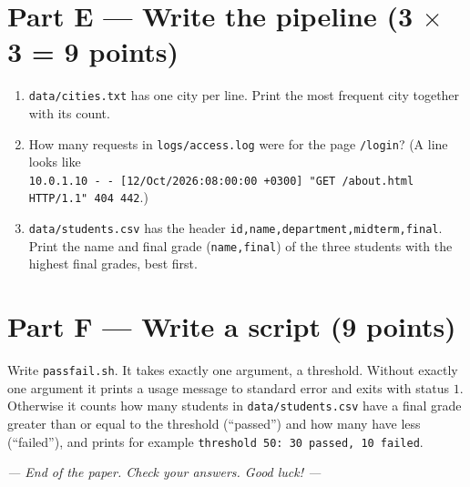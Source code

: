 \documentclass[11pt,a4paper]{article}
\begin{document}
\section*{Part E --- Write the pipeline \hfill (3 $\times$ 3 = 9 points)}
\begin{enumerate}[leftmargin=1.8em,label=E\arabic*.]
  \item \texttt{data/cities.txt} has one city per line. Print the most frequent city together with its count. \ans{1.1cm}
  \item How many requests in \texttt{logs/access.log} were for the page \texttt{/login}? (A line looks like\\ \texttt{10.0.1.10 - - [12/Oct/2026:08:00:00 +0300] "GET /about.html HTTP/1.1" 404 442}.) \ans{1.1cm}
  \item \texttt{data/students.csv} has the header \texttt{id,name,department,midterm,final}. Print the name and final grade (\texttt{name,final}) of the three students with the highest final grades, best first. \ans{1.1cm}
\end{enumerate}

\section*{Part F --- Write a script \hfill (9 points)}
Write \texttt{passfail.sh}. It takes exactly one argument, a threshold. Without exactly one argument it prints a usage message to standard error and exits with status $1$. Otherwise it counts how many students in \texttt{data/students.csv} have a final grade greater than or equal to the threshold (``passed'') and how many have less (``failed''), and prints for example \texttt{threshold 50: 30 passed, 10 failed}.
\ans{9.0cm}

\begin{center}\itshape --- End of the paper. Check your answers. Good luck! ---\end{center}
\end{document}
